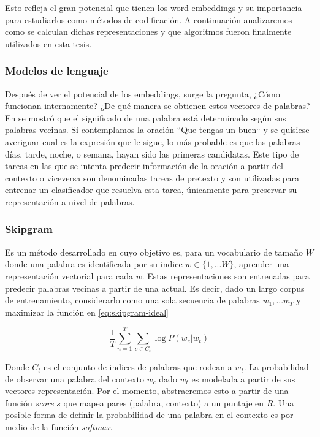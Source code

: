Esto refleja el gran potencial que tienen los word embeddings y su importancia
para estudiarlos como métodos de codificación. A continuación analizaremos como
se calculan dichas representaciones y que algoritmos fueron finalmente
utilizados en esta tesis.

\subsubsection{Modelos de lenguaje}

Después de ver el potencial de los embeddings, surge la pregunta, ¿Cómo
funcionan internamente? ¿De qué manera se obtienen estos vectores de palabras?
En \citep{firth-57} se mostró que el significado de una palabra está determinado
según sus palabras vecinas. Si contemplamos la oración ``Que tengas un buen`` y
se quisiese averiguar cual es la expresión que le sigue, lo más probable es que
las palabras días, tarde, noche, o semana, hayan sido las primeras candidatas.
Este tipo de tareas en las que se intenta predecir información de la oración a
partir del contexto o viceversa son denominadas tareas de pretexto y son
utilizadas para entrenar un clasificador que resuelva esta tarea, únicamente
para preservar su representación a nivel de palabras.

\subsubsection{Skipgram}

Es un método desarrollado en \citep{Mikolov-2013} cuyo objetivo es, para un
vocabulario de tamaño $W$ donde una palabra es identificada por su indice $w \in
\{1, ... W\}$, aprender una representación vectorial para cada $w$. Estas
representaciones son entrenadas para predecir palabras vecinas a partir de una
actual. Es decir, dado un largo corpus de entrenamiento, considerarlo como una
sola secuencia de palabras $w_1, ... w_T$ y maximizar la función en \ref{eq:skipgram-ideal}

\begin{equation} \label{eq:skipgram-ideal}
    \frac{1}{T} \sum_{n=1}^{T}
                    \sum_{c \in C_t} \log P(w_c | w_t)
\end{equation}

Donde $C_t$ es el conjunto de indices de palabras que rodean a $w_t$. La
probabilidad de observar una palabra del contexto $w_c$ dado $w_t$ es modelada a
partir de sus vectores representación. Por el momento, abstraeremos esto a
partir de una función \emph{score} $s$ que mapea pares (palabra, contexto) a un
puntaje en $R$. Una posible forma de definir la probabilidad de una palabra en
el contexto es por medio de la función \emph{softmax}.

